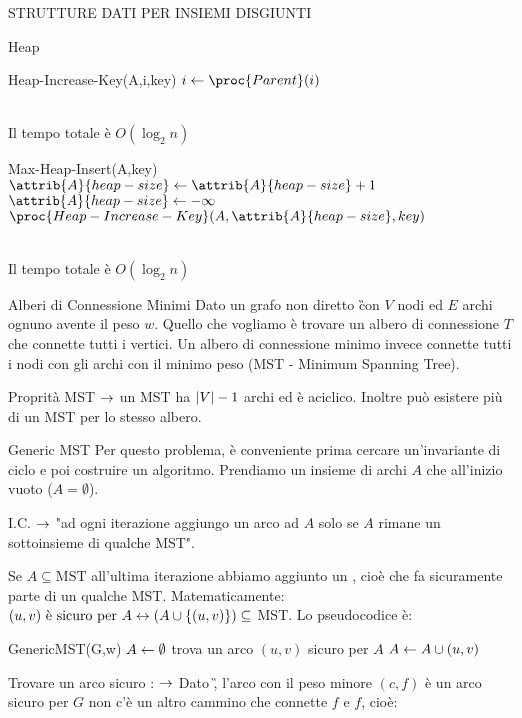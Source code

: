 \documentclass[8pt]{extarticle}
\begin{document}
\begin{formulario}
\begin{myParagraph}{STRUTTURE DATI PER INSIEMI DISGIUNTI}
\begin{subParagraph}{Heap}
\begin{code}{Heap-Increase-Key(A,i,key)}
	\li $i\get \proc{Parent}(i)$
\END
				\end{code}
\\
Il tempo totale è $O(\log_2 n)$\\
				\begin{code}{Max-Heap-Insert(A,key)}
\li $\attrib{A}{heap-size}\get \attrib{A}{heap-size}+1$
\li $\attrib{A}{heap-size}\get -\infty$
\li $\proc{Heap-Increase-Key}(A,\attrib{A}{heap-size},key)$
				\end{code}
\\
Il tempo totale è $O(\log_2 n)$\\
			\end{subParagraph}
	\end{myParagraph}
	
	\begin{myParagraphEnd}{Alberi di Connessione Minimi}
Dato un grafo non diretto \G con $V$ nodi ed $E$ archi ognuno avente il peso $w$. Quello che vogliamo è trovare un albero di connessione $T$ che connette tutti i vertici. Un albero di connessione minimo invece connette tutti i nodi con gli archi con il minimo peso (MST - Minimum Spanning Tree).
		\begin{Descr} 
			\item[Proprità MST] $\rightarrow$ un MST ha $\left\vert V \right\vert-1$ archi ed è aciclico. Inoltre può esistere più di un MST per lo stesso albero.
		\end{Descr}
		\begin{subParagraph}{Generic MST}
Per questo problema, è conveniente prima cercare un'invariante di ciclo e poi costruire un algoritmo. Prendiamo un insieme di archi $A$ che all'inizio vuoto ($A=\emptyset$). 
			\begin{Descr} 
				\item[I.C.] $\rightarrow$ "ad ogni iterazione aggiungo un arco ad $A$ solo se $A$ rimane un sottoinsieme di qualche MST".
			\end{Descr}
Se $A\subseteq \text{MST}$ all'ultima iterazione abbiamo aggiunto un , cioè che fa sicuramente parte di un qualche MST. Matematicamente: $(u,v) \text{ è sicuro per } A \leftrightarrow (A\cup \{(u,v)\})\subseteq$ MST. Lo pseudocodice è:
			\begin{code}{GenericMST(G,w)}
\li $A\leftarrow\emptyset$
\li {}
	\li trova un arco $(u,v)$ sicuro per $A$
	\li $A \leftarrow A\cup(u,v)$
\END
			\end{code}
			\begin{Descr} 
				\item[Trovare un arco sicuro]: $\rightarrow$ Dato \G, l'arco con il peso minore $(c,f)$ è un arco sicuro per $G$ \SSE non c'è un altro cammino che connette $f$ e $f$, cioè:\\

\end{Descr}
\end{subParagraph}
\end{myParagraphEnd}
\end{formulario}
\end{document}
